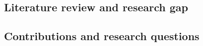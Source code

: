 \documentclass[a4paper,fleqn]{cas-sc}
\newcommand{\new}[1]{\textcolor[HTML]{1A5FB4}{#1}}   %
\newcommand{\new}[1]{#1}
\begin{document}
\subsection{Literature review and research gap}
\new{}


\subsection{Contributions and research questions}
\end{document}
